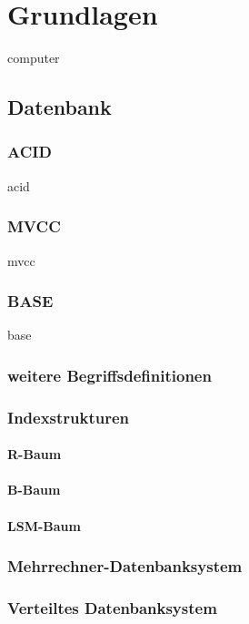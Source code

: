 \chapter{Grundlagen}
\Gls{computer}

\section{Datenbank}

\subsection{ACID}
\Gls{acid}

\subsection{MVCC}
\Gls{mvcc}

\subsection{BASE}
\Gls{base}

\subsection{weitere Begriffsdefinitionen}

\subsection{Indexstrukturen}

\subsubsection{R-Baum}

\subsubsection{B-Baum}

\subsubsection{LSM-Baum}

\subsection{Mehrrechner-Datenbanksystem}

\subsection{Verteiltes Datenbanksystem}

